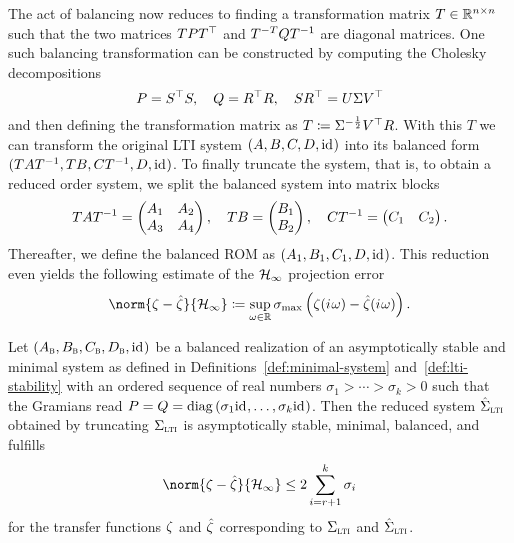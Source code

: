 The act of balancing now reduces to finding a transformation matrix $T \in \mathbb{R}^{n \times n}$ such that the two matrices $T P T^{\top}$ and $T\inv[T] Q T\inv$ are diagonal matrices.
One such balancing transformation can be constructed by computing the Cholesky decompositions
\begin{equation}\label{eq:balancing}
    P = S^{\top} S,\quad Q = R^{\top} R,\quad S R^{\top} = U \Sigma V^{\top}
\end{equation}
and then defining the transformation matrix as $T \coloneqq \Sigma\inv[\frac{1}{2}] V\trans R$.
With this $T$ we can transform the original \ac{LTI} system $(A, B, C, D, \text{id}_{})$ into its balanced form $(T A T\inv, T B, C T\inv, D, \id)$.
To finally truncate the system, that is, to obtain a reduced order system, we split the balanced system into matrix blocks
\begin{equation*}
    T A T\inv = \begin{pmatrix}
        A_1 & A_2 \\
        A_3 & A_4
    \end{pmatrix},\quad T B = \begin{pmatrix}
        B_1 \\
        B_2
    \end{pmatrix},\quad C T\inv = \begin{pmatrix}
        C_1 & C_2
    \end{pmatrix}.
\end{equation*}
Thereafter, we define the balanced \ac{ROM} as $(A_1, B_1, C_1, D, \text{id}_{})$.
This reduction even yields the following estimate of the $\mathcal{H}_\infty$ projection error
\begin{equation*}
	\norm{\tfunc - \hat{\tfunc}}{\mcl{H}_\infty} \coloneqq \sup\limits_{\omega \in \bb{R}} \sigma_{\max} \left( \tfunc(\iu \omega) - \hat{\tfunc}(\iu \omega) \right).
\end{equation*}

\begin{theorem}\label{thm:h-inf-error}
    Let $(A_{\textnormal{\scshape b}}, B_{\textnormal{\scshape b}}, C_{\textnormal{\scshape b}}, D_{\textnormal{\scshape b}}, \text{id}_{})$ be a balanced realization of an asymptotically stable and minimal system as defined in Definitions~\ref{def:minimal-system} and~\ref{def:lti-stability} with an ordered sequence of real numbers $\sigma_1 > \cdots > \sigma_k > 0$ such that the Gramians read $P = Q = \mathop{}\!\mathrm{diag}\left(\sigma_1 \text{id}_{}, \dots, \sigma_k \text{id}_{}\right)$.
    Then the reduced system $\hat{\Sigma}_{\textnormal{\scshape lti}}$ obtained by truncating $\Sigma_{\textnormal{\scshape lti}}$ is asymptotically stable, minimal, balanced, and fulfills
    \begin{equation*}
        \norm{\tfunc - \hat{\tfunc}}{\mcl{H}_\infty} \leq 2 \sum\limits_{i = r + 1}^k \sigma_i
    \end{equation*}
    for the transfer functions $\zeta$ and $\hat{\zeta}$ corresponding to $\Sigma_{\textnormal{\scshape lti}}$ and $\hat{\Sigma}_{\textnormal{\scshape lti}}$.
\end{theorem}

